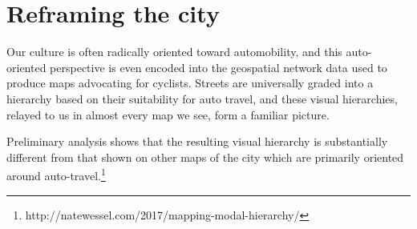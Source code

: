 \documentclass{article}
\begin{document}
		\section*{Reframing the city}
		Our culture is often radically oriented toward automobility, and this  auto-oriented perspective is even encoded into the geospatial network data used to produce maps advocating for cyclists. Streets are universally graded into a hierarchy based on their suitability for auto travel, and these visual hierarchies, relayed to us in almost every map we see, form a familiar picture. 
		
		Preliminary analysis shows that the resulting visual hierarchy is substantially different from that shown on other maps of the city which are primarily oriented around auto-travel.\footnote{
			http://natewessel.com/2017/mapping-modal-hierarchy/
		} 
	
\end{document}
